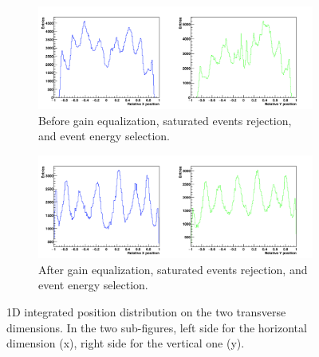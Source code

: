 \begin{figure}
\begin{subfigure}[t]{0.5\textwidth}
\centering
\includegraphics[width=1.05\textwidth]{03_GraphicFiles/chapter6_BeamTests/Nice_September2018/287_noSel/raw_1dProfiles.png}
\caption{Before gain equalization, saturated events rejection, and event energy selection.}
\label{chap6::fig::abssingleAxisRawProfile}
\end{subfigure}
\begin{subfigure}[t]{0.5\textwidth}
\centering
\includegraphics[width=1.05\textwidth]{03_GraphicFiles/chapter6_BeamTests/Nice_September2018/287_noSel/2_profile_canvas_cal.png}
\caption{After gain equalization, saturated events rejection, and event energy selection.}
\label{chap6::fig::abssingleAxisCalProfile}
\end{subfigure}
\caption{1D integrated position distribution on the two transverse dimensions. In the two sub-figures, left side for the horizontal dimension (x), right side for the vertical one (y).}
\label{chap6::fig::absXYprofiles}
\end{figure}

